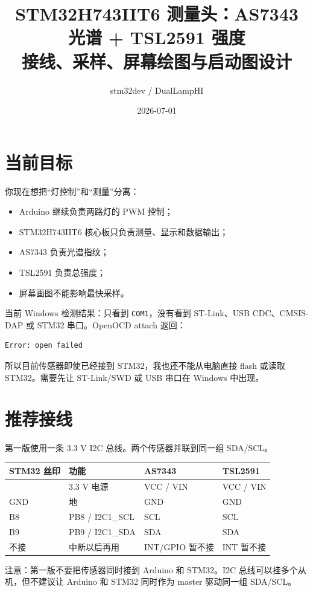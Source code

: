 \documentclass[11pt,a4paper]{ctexart}
\title{STM32H743IIT6 测量头：AS7343 光谱 + TSL2591 强度\\接线、采样、屏幕绘图与启动图设计}
\author{stm32dev / DualLampHI}
\date{2026-07-01}
\begin{document}
\maketitle

\section{当前目标}

你现在想把“灯控制”和“测量”分离：

\begin{itemize}
  \item Arduino 继续负责两路灯的 PWM 控制；
  \item STM32H743IIT6 核心板只负责测量、显示和数据输出；
  \item AS7343 负责光谱指纹；
  \item TSL2591 负责总强度；
  \item 屏幕画图不能影响最快采样。
\end{itemize}

当前 Windows 检测结果：只看到 \texttt{COM1}，没有看到 ST-Link、USB CDC、CMSIS-DAP 或 STM32 串口。OpenOCD attach 返回：

\begin{lstlisting}
Error: open failed
\end{lstlisting}

所以目前传感器即使已经接到 STM32，我也还不能从电脑直接 flash 或读取 STM32。需要先让 ST-Link/SWD 或 USB 串口在 Windows 中出现。

\section{推荐接线}

第一版使用一条 3.3 V I2C 总线。两个传感器并联到同一组 SDA/SCL。

\begin{longtable}{>{\ttfamily}p{24mm} p{34mm} p{34mm} p{34mm}}
\toprule
STM32 丝印 & 功能 & AS7343 & TSL2591\\
\midrule
3.3 & 3.3 V 电源 & VCC / VIN & VCC / VIN\\
GND & 地 & GND & GND\\
B8 & PB8 / I2C1\_SCL & SCL & SCL\\
B9 & PB9 / I2C1\_SDA & SDA & SDA\\
不接 & 中断以后再用 & INT/GPIO 暂不接 & INT 暂不接\\
\bottomrule
\end{longtable}

注意：第一版不要把传感器同时接到 Arduino 和 STM32。I2C 总线可以挂多个从机，但不建议让 Arduino 和 STM32 同时作为 master 驱动同一组 SDA/SCL。
\end{document}
